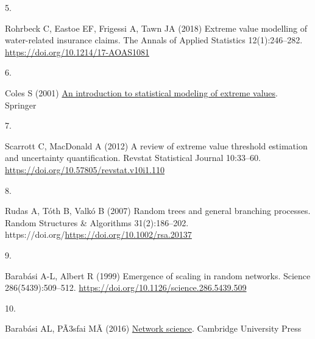 \documentclass[
  10pt,
  a4paper,
]{scrreprt}
\newlength{\cslhangindent}
\newlength{\csllabelwidth}
\newlength{\cslentryspacingunit} %
\newenvironment{CSLReferences}[2] %
 {%
  \setlength{\parindent}{0pt}
  \ifodd #1
  \let\oldpar\par
  \def\par{\hangindent=\cslhangindent\oldpar}
  \fi
  \setlength{\parskip}{#2\cslentryspacingunit}
 }%
 {}
\newcommand{\CSLLeftMargin}[1]{\parbox[t]{\csllabelwidth}{#1}}
\newcommand{\CSLRightInline}[1]{\parbox[t]{\linewidth - \csllabelwidth}{#1}\break}
\theoremstyle{plain}
\theoremstyle{plain}
\theoremstyle{definition}
\theoremstyle{plain}
\theoremstyle{remark}
\begin{document}
{\begin{CSLReferences}{0}{0}
\leavevmode{}%
\CSLLeftMargin{5. }%
\CSLRightInline{Rohrbeck C, Eastoe EF, Frigessi A, Tawn JA (2018)
{Extreme value modelling of water-related insurance claims}. The Annals
of Applied Statistics 12(1):246--282.
\url{https://doi.org/10.1214/17-AOAS1081}}

\leavevmode{}%
\CSLLeftMargin{6. }%
\CSLRightInline{Coles S (2001)
\href{https://books.google.co.uk/books?id=2nugUEaKqFEC}{An introduction
to statistical modeling of extreme values}. Springer}

\leavevmode{}%
\CSLLeftMargin{7. }%
\CSLRightInline{Scarrott C, MacDonald A (2012) A review of extreme value
threshold estimation and uncertainty quantification. Revstat Statistical
Journal 10:33--60. \url{https://doi.org/10.57805/revstat.v10i1.110}}

\leavevmode{}%
\CSLLeftMargin{8. }%
\CSLRightInline{Rudas A, Tóth B, Valkó B (2007) Random trees and general
branching processes. Random Structures \& Algorithms 31(2):186--202.
https://doi.org/\url{https://doi.org/10.1002/rsa.20137}}

\leavevmode{}%
\CSLLeftMargin{9. }%
\CSLRightInline{Barabási A-L, Albert R (1999) Emergence of scaling in
random networks. Science 286(5439):509--512.
\url{https://doi.org/10.1126/science.286.5439.509}}

\leavevmode{}%
\CSLLeftMargin{10. }%
\CSLRightInline{Barabási AL, PÃ3sfai MÃ (2016)
\href{https://books.google.co.uk/books?id=iLtGDQAAQBAJ}{Network
science}. Cambridge University Press}

\end{CSLReferences}
\end{document}
